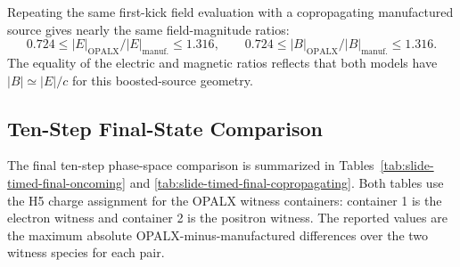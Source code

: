 \documentclass[11pt]{article}
\begin{document}
\begin{table}[htbp]
  \centering
  \caption{First-kick field magnitudes for the slide-timed pair decks,
  compared with the oncoming manufactured source.  Electron and positron rows
  have the same field magnitudes for each pair, so the table lists the pair
  mean.  \underline{Key result:} the field magnitude disagreement is now at
  the \(0.72\)--\(1.32\) level, not orders of magnitude.}
  \label{tab:slide-timed-first-kick-fields-oncoming}
\end{table}

Repeating the same first-kick field evaluation with a copropagating
manufactured source gives nearly the same field-magnitude ratios:
\[
  0.724 \le
  |E|_{\mathrm{OPALX}}/|E|_{\mathrm{manuf.}}
  \le 1.316,
  \qquad
  0.724 \le
  |B|_{\mathrm{OPALX}}/|B|_{\mathrm{manuf.}}
  \le 1.316.
\]
The equality of the electric and magnetic ratios reflects that both models have
\(|B|\simeq |E|/c\) for this boosted-source geometry.

\subsection{Ten-Step Final-State Comparison}

The final ten-step phase-space comparison is summarized in
Tables~\ref{tab:slide-timed-final-oncoming} and
\ref{tab:slide-timed-final-copropagating}.  Both tables use the H5 charge
assignment for the OPALX witness containers: container 1 is the electron
witness and container 2 is the positron witness.  The reported values are the
maximum absolute OPALX-minus-manufactured differences over the two witness
species for each pair.
\end{document}
